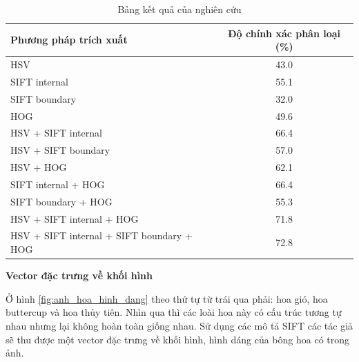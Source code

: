 \documentclass[12pt]{report}
\begin{document}
																																														
		\begin{table}[h]
			\centering
			\caption{Bảng kết quả của nghiên cứu \cite{cia-Nilsback08}}
			\label{tbl:table ket qua cua Nilsback08}
			\begin{tabular}{|l|c|}
				\hline
				\textbf{Phương pháp trích xuất}      & \textbf{Độ chính xác phân loại (\%)} \\ \hline
				HSV                                       & 43.0                                         \\ \hline
				SIFT internal                             & 55.1                                         \\ \hline
				SIFT boundary                             & 32.0                                         \\ \hline
				HOG                                       & 49.6                                         \\ \hline
				HSV + SIFT internal                       & 66.4                                         \\ \hline
				HSV + SIFT boundary                       & 57.0                                         \\ \hline
				HSV + HOG                                 & 62.1                                         \\ \hline
				SIFT internal + HOG                       & 66.4                                         \\ \hline
				SIFT boundary + HOG                       & 55.3                                         \\ \hline
				HSV + SIFT internal + HOG                 & 71.8                                         \\ \hline
				HSV + SIFT internal + SIFT boundary + HOG & 72.8                                         \\ \hline
																																																																																												
			\end{tabular}
		\end{table}
																																																
																																								
		\textbf{Vector đặc trưng về khối hình}
																																		
		Ở hình \ref{fig:anh_hoa_hinh_dang} theo thứ tự từ trái qua phải: hoa gió, hoa buttercup và hoa thủy tiên. Nhìn qua thì các loài hoa này có cấu trúc tương tự nhau nhưng lại không hoàn toàn giống nhau. Sử dụng các mô tả SIFT \cite{cia_SIFT} các tác giả sẽ thu được một vector đặc trưng về khối hình, hình dáng của bông hoa có trong ảnh.				 
																																											
\end{document}
